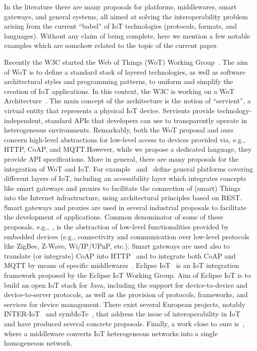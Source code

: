 In the literature there are many proposals for platforms, middlewares, smart
gateways, and general systems, all aimed at solving the interoperability
problem arising from the current ``babel'' of IoT technologies (protocols,
formats, and languages). Without any claim of being complete, here we mention a
few notable examples which are somehow related to the topic of the current paper.

Recently the W3C started the Web of Things (WoT) Working Group~\cite{w3c17}. The
aim of WoT is to define a standard stack of layered technologies, as well as
software architectural styles and programming patterns, to uniform and simplify
the creation of IoT applications. In this context, the W3C is working on a WoT
Architecture~\cite{wot.arch}. The main concept of the architecture is the notion
of ``servient'', a virtual entity that represents a physical IoT device.
Servients provide technology-independent, standard APIs that developers can use
to transparently operate in heterogeneous environments. Remarkably, both the
WoT proposal and ours concern high-level
abstractions for low-level access to devices provided via, e.g., HTTP, CoAP, and
MQTT.\@ However, while we propose a dedicated language, they provide API
specifications.
%
More in general, there are many proposals for the integration of WoT and IoT.\@
For example~\cite{dominique2011web} and~\cite{corredor2014lightweight} define
general platforms covering different layers of IoT, including an accessibility
layer which integrates concepts like smart gateways and proxies to facilitate
the connection of (smart) Things into the Internet infrastructure, using
architectural principles based on REST.
%
Smart gateways and proxies are used in several industrial proposals to
facilitate the development of applications. Common denominator of some of these
proposals, e.g.,~\cite{60,61,62}, is the abstraction of low-level
functionalities provided by embedded devices (e.g., connectivity and
communication over low-level protocols like ZigBee, Z-Wave, Wi/IP/UPnP, etc.).
Smart gateways are used also to translate (or integrate) CoAP into
HTTP~\cite{7811451,s150101217,7037719} and to integrate both CoAP and MQTT by
means of specific middlewares~\cite{6827678}. Eclipse IoT~\cite{EplicseIoT} is
an IoT integration framework proposed by the Eclipse IoT Working Group. Aim of
Eclipse IoT is to build an open IoT stack for Java, including the support for
device-to-device and device-to-server protocols, as well as the provision of
protocols, frameworks, and services for device management. There exist several
 European projects, notably INTER-IoT~\cite{7471373} and
symbIoTe~\cite{Gojmerac16}, that address the issue of interoperability in IoT
and have produced several concrete proposals. Finally, a work close to ours
is~\cite{Zhiliang11}, where a middleware converts IoT heterogeneous networks
into a single homogeneous network.

